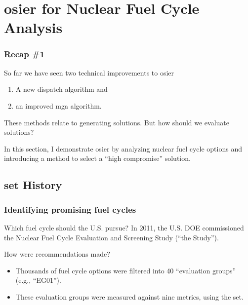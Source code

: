 \section{\gls{osier} for Nuclear Fuel Cycle Analysis}

\begin{frame}
    \frametitle{Recap \#1}

    So far we have seen two technical improvements to \gls{osier}

    \begin{enumerate}
        \item A new dispatch algorithm and
        \item an improved \gls{mga} algorithm.
    \end{enumerate}

    These methods relate to generating solutions. But how should we evaluate 
    solutions?
    
    In this section, I demonstrate \gls{osier} by analyzing nuclear fuel cycle options
    and introducing a method to select a ``high compromise'' solution.
\end{frame}

\subsection{\gls{set} History}
\begin{frame}
    \frametitle{Identifying promising fuel cycles}
    \begin{block}{Which fuel cycle should the U.S. pursue?}
        In 2011, the U.S. \Gls{DOE} commissioned the Nuclear Fuel Cycle
        Evaluation and Screening Study (``the Study'').
    \end{block}
    \begin{block}{How were recommendations made?}
        \begin{itemize}[<+->]
            \item Thousands of fuel cycle options were filtered into 40
            ``evaluation groups'' (e.g., ``EG01'').
            \item These evaluation groups were measured against nine metrics,
            using the \gls{set}.
        \end{itemize}
    \end{block}
\end{frame}

